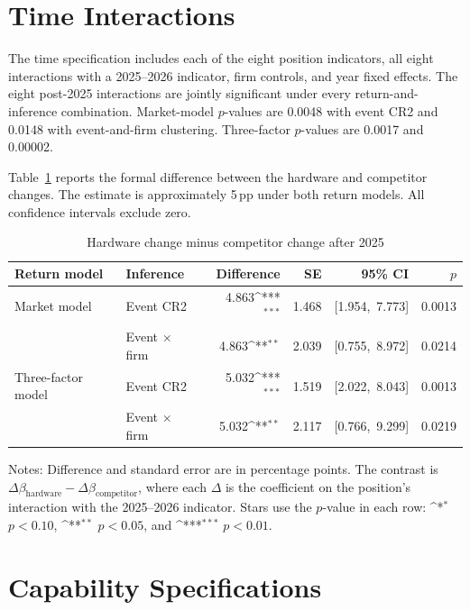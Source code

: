 \documentclass[12pt]{article}
\newcommand{\pp}{\,pp}
\newcommand{\sym}[1]{\ifmmode^{#1}\else\(^{#1}\)\fi}
\begin{document}
\section{Time Interactions}

The time specification includes each of the eight position indicators, all
eight interactions with a 2025--2026 indicator, firm controls, and year
fixed effects. The eight post-2025 interactions are jointly significant
under every return-and-inference combination. Market-model $p$-values are
0.0048 with event CR2 and 0.0148 with event-and-firm clustering.
Three-factor $p$-values are 0.0017 and 0.00002.

Table~\ref{tab:a4} reports the formal difference between the hardware and
competitor changes. The estimate is approximately 5\pp{} under both return
models. All confidence intervals exclude zero.

\begin{table}[H]
\centering
\begin{threeparttable}
\caption{Hardware change minus competitor change after 2025}
\label{tab:a4}
\small
\setlength{\tabcolsep}{4pt}
\begin{tabular}{llrrrr}
\toprule
Return model & Inference & Difference & SE & 95\% CI & $p$ \\
\midrule
Market model
 & Event CR2 & 4.863\sym{***} & 1.468 & [1.954,\ 7.773] & 0.0013 \\
 & Event $\times$ firm & 4.863\sym{**} & 2.039 & [0.755,\ 8.972] & 0.0214 \\
\addlinespace
Three-factor model
 & Event CR2 & 5.032\sym{***} & 1.519 & [2.022,\ 8.043] & 0.0013 \\
 & Event $\times$ firm & 5.032\sym{**} & 2.117 & [0.766,\ 9.299] & 0.0219 \\
\bottomrule
\end{tabular}
\begin{tablenotes}\footnotesize
\item Notes: Difference and standard error are in percentage points. The
contrast is
$\Delta\beta_{\mathrm{hardware}}-\Delta\beta_{\mathrm{competitor}}$,
where each $\Delta$ is the coefficient on the position's interaction with
the 2025--2026 indicator.
Stars use the $p$-value in each row:
\sym{*} $p<0.10$, \sym{**} $p<0.05$, and \sym{***} $p<0.01$.
\end{tablenotes}
\end{threeparttable}
\end{table}

\section{Capability Specifications}
\end{document}
